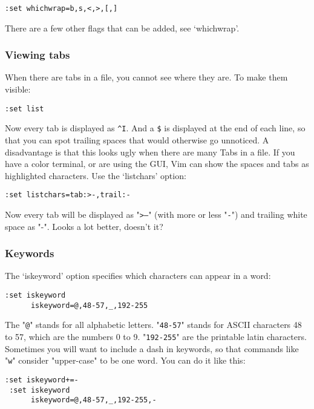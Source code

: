  \begin{Verbatim}[samepage=true]
 :set whichwrap=b,s,<,>,[,]
 \end{Verbatim}

There are a few other flags that can be added, see `whichwrap'.

\subsubsection{Viewing tabs}
When there are tabs in a file, you cannot see where they are.
To make them visible:

 \begin{Verbatim}[samepage=true]
 :set list
 \end{Verbatim}

Now every tab is displayed as \texttt{\^{}I}.
And a \texttt{\$} is displayed at the end of each line, so that you can spot trailing spaces that would otherwise go unnoticed.
A disadvantage is that this looks ugly when there are many Tabs in a file.
If you have a color terminal, or are using the GUI, Vim can show the spaces and tabs as highlighted characters.
Use the `listchars' option:

 \begin{Verbatim}[samepage=true]
 :set listchars=tab:>-,trail:-
 \end{Verbatim}

Now every tab will be displayed as "\texttt{>---}" (with more or less "\texttt{-}") and trailing white space as "-".
Looks a lot better, doesn't it?

\subsubsection{Keywords}
The `iskeyword' option specifies which characters can appear in a word:

\begin{Verbatim}[samepage=true]
 :set iskeyword
      iskeyword=@,48-57,_,192-255
\end{Verbatim}

The "\texttt{@}" stands for all alphabetic letters.
"\texttt{48-57}" stands for ASCII characters 48 to 57, which are the numbers 0 to 9.
"\texttt{192-255}" are the printable latin characters.
Sometimes you will want to include a dash in keywords, so that commands like "\texttt{w}" consider "upper-case" to be one word.
You can do it like this:

\begin{Verbatim}[samepage=true]
 :set iskeyword+=-
 :set iskeyword
      iskeyword=@,48-57,_,192-255,-
\end{Verbatim}

